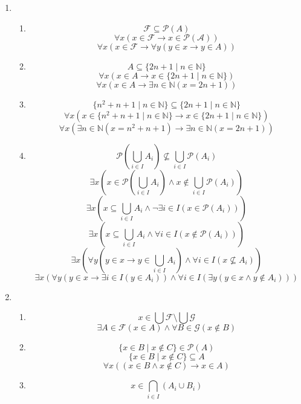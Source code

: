 \begin{enumerate}
    \item
    \begin{enumerate}
        \item 
        \[\mathscr{F} \subseteq \mathscr{P}(A)\]
        \[\forall x (x \in \mathscr{F} \rightarrow x \in \mathscr{P(A)})\]
        \[\forall x (x \in \mathscr{F} \rightarrow \forall y (y \in x \rightarrow y \in A) )\]
        \item 
        \[A \subseteq \{2n + 1 \mid n \in \mathbb{N}\}\]
        \[\forall x (x \in A \rightarrow x \in \{2n + 1 \mid n \in \mathbb{N}\})\]
        \[\forall x (x \in A \rightarrow \exists n \in \mathbb{N} (x = 2n + 1))\]
        \item 
        \[\{n^2 + n + 1 \mid n \in \mathbb{N}\} \subseteq \{2n+1 \mid n \in \mathbb{N}\}\]
        \[\forall x (x \in \{n^2 + n + 1 \mid n \in \mathbb{N}\} \rightarrow x \in \{2n+1 \mid n \in \mathbb{N}\})\]
        \[\forall x (\exists n \in \mathbb{N} (x = n^2 + n + 1) \rightarrow \exists n \in \mathbb{N} (x = 2n + 1))\]
        \item 
        \[\mathscr{P}(\bigcup_{i \in I} A_i) \not \subseteq \bigcup_{i \in I} \mathscr{P}(A_i)\]
        \[\exists x (x \in \mathscr{P}(\bigcup_{i \in I} A_i) \land x \not \in \bigcup_{i \in I} \mathscr{P}(A_i))\]
        \[\exists x (x \subseteq \bigcup_{i \in I} A_i \land \lnot \exists i \in I (x \in \mathscr{P}(A_i)))\]
        \[\exists x (x \subseteq \bigcup_{i \in I} A_i \land \forall i \in I (x \notin \mathscr{P}(A_i)))\]
        \[\exists x (\forall y (y \in x \rightarrow y \in \bigcup_{i \in I} A_i) \land \forall i \in I (x \not \subseteq A_i))\]
        \[\exists x (\forall y (y \in x \rightarrow \exists i \in I (y \in A_i)) \land \forall i \in I (\exists y(y \in x \land y \not \in A_i)))\]
    \end{enumerate}
    \item
    \begin{enumerate}
        \item 
        \[x \in \bigcup \mathscr{F} \setminus \bigcup \mathscr{G}\]
        \[\exists A \in \mathscr{F} (x \in A) \land \forall B \in \mathscr{G} (x \notin B)\]
        \item 
        \[\{x \in B \mid x \notin C\} \in \mathscr{P}(A)\]
        \[\{x \in B \mid x \notin C\} \subseteq A\]
        \[\forall x ((x \in B \land x \notin C) \rightarrow x \in A)\]
        \item 
        \[x \in \bigcap_{i \in I} (A_i \cup B_i)\]

\end{enumerate}
\end{enumerate}
